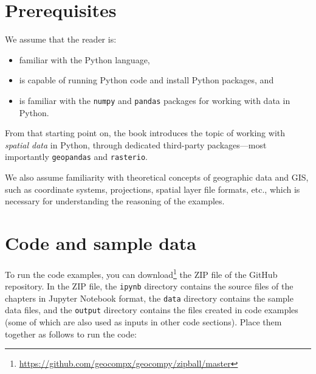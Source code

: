 \documentclass[
  letterpaper,
]{krantz}
\providecommand{\tightlist}{%
  \setlength{\itemsep}{0pt}\setlength{\parskip}{0pt}}\usepackage{longtable,booktabs,array}
\begin{document}
\section*{Prerequisites}\label{prerequisites}


We assume that the reader is:

\begin{itemize}
\tightlist
\item
  familiar with the Python language,
\item
  is capable of running Python code and install Python packages, and
\item
  is familiar with the \texttt{numpy} and \texttt{pandas} packages for
  working with data in Python.
\end{itemize}

From that starting point on, the book introduces the topic of working
with \emph{spatial data} in Python, through dedicated third-party
packages---most importantly \texttt{geopandas} and \texttt{rasterio}.

We also assume familiarity with theoretical concepts of geographic data
and GIS, such as coordinate systems, projections, spatial layer file
formats, etc., which is necessary for understanding the reasoning of the
examples.

\section*{Code and sample data}\label{code-and-sample-data}


To run the code examples, you can download\footnote{\url{https://github.com/geocompx/geocompy/zipball/master}}
the ZIP file of the GitHub repository. In the ZIP file, the
\texttt{ipynb} directory contains the source files of the chapters in
Jupyter Notebook format, the \texttt{data} directory contains the sample
data files, and the \texttt{output} directory contains the files created
in code examples (some of which are also used as inputs in other code
sections). Place them together as follows to run the code:
\end{document}
